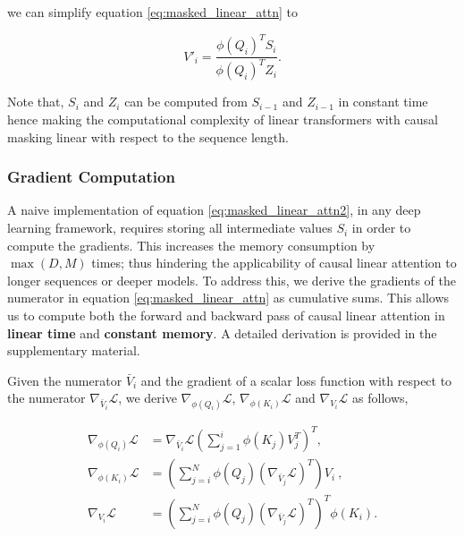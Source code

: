 we can simplify equation \ref{eq:masked_linear_attn} to

\begin{equation}
    V'_i = \frac{\phi\left(Q_i\right)^T S_i}
                {\phi\left(Q_i\right)^T Z_i}.
    \label{eq:masked_linear_attn2}
\end{equation}

Note that, $S_i$ and $Z_i$ can be computed from $S_{i-1}$ and $Z_{i-1}$ in constant time hence making the computational complexity of linear transformers with causal masking linear with respect to the sequence length.

\subsubsection{Gradient Computation}

A naive implementation of equation \ref{eq:masked_linear_attn2}, in any deep learning framework, requires storing all intermediate values $S_i$ in order to compute the gradients. This increases the memory consumption by $\max\left(D,
M\right)$ times; thus hindering the applicability of causal linear attention to longer sequences or deeper models. To address this, we derive the gradients of the numerator in equation \ref{eq:masked_linear_attn} as cumulative sums. This allows us to compute both the forward and backward pass of causal linear attention in
\textbf{linear time} and \textbf{constant memory}. A detailed derivation is provided in the supplementary material.

Given the numerator $\bar{V}_i$ and the gradient of a scalar loss function with respect to the numerator $\nabla_{\bar{V}_i}\mathcal{L}$, we derive
$\nabla_{\phi\left(Q_i\right)}\mathcal{L}$, $\nabla_{\phi\left(K_i\right)}\mathcal{L}$ and $\nabla_{V_i}\mathcal{L}$ as follows,

\begin{align}
    \nabla_{\phi\left(Q_i\right)} \mathcal{L} &= \nabla_{\bar{V}_i}\mathcal{L}
        \left(\sum_{j=1}^i \phi\left(K_j\right) V_j^T\right)^T,
        \label{eq:grad_q} \\
    \nabla_{\phi\left(K_i\right)}\mathcal{L} &= \left(\sum_{j=i}^N \phi\left(Q_j\right)
        \left(\nabla_{\bar{V}_j}\mathcal{L}\right)^T\right) V_i\ ,
        \label{eq:grad_k} \\
    \nabla_{V_i}\mathcal{L} &= \left(\sum_{j=i}^N \phi\left(Q_j\right)
        \left(\nabla_{\bar{V}_j}\mathcal{L}\right)^T\right)^T \phi\left(K_i\right).
        \label{eq:grad_v}
\end{align}

